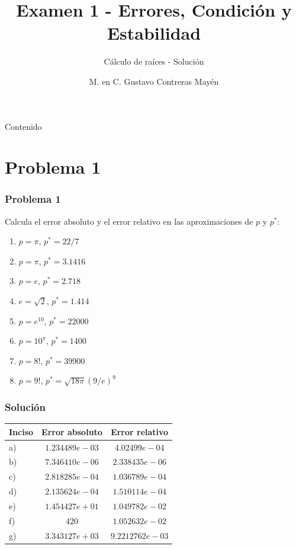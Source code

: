 


\title{Examen 1 - Errores, Condición y Estabilidad}
\subtitle{C\'alculo de ra\'{i}ces - Soluci\'{o}n}
\author{M. en C. Gustavo Contreras Mayén}
\maketitle
\fontsize{14}{14}\selectfont
{}
\begin{frame}{Contenido}
\tableofcontents[pausesections]
\end{frame}
\section{Problema 1}
\begin{frame}
\frametitle{Problema 1}
Calcula el error absoluto y el error relativo en las aproximaciones de $p$ y $p^{*}$:
\begin{multicols}{2}
\begin{enumerate}
\item $p = \pi$, $p^{*} = 22/7$
\item $p = \pi$, $p^{*} = 3.1416$
\item $p = e$, $p^{*} = 2.718$
\item $e = \sqrt{2}$, $p^{*} = 1.414$
\item $p= e^{10}$, $p^{*} = 22000$
\item $p= 10^{\pi}$, $p^{*} = 1400$
\item $p = 8!$, $p^{*}=39900$
\item $p = 9!$, $p^{*}= \sqrt{18 \pi} (9/e)^{9}$
\end{enumerate}
\end{multicols}
\end{frame}
\begin{frame}
\frametitle{Solución}
\begin{tabular}{l | c | c}
\hline
Inciso & Error absoluto & Error relativo \\ \hline
a) & $1.234489e-03$ & $4.02499e-04$ \\ \hline
b) & $7.346410e-06$ & $2.338435e-06$ \\ \hline
c) & $2.818285e-04$ & $1.036789e-04$ \\ \hline
d) & $2.135624e-04$ & $1.510114e-04$ \\ \hline
e) & $1.454427e+01$ & $1.049782e-02$ \\ \hline
f) & $420$ & $1.052632e-02$ \\ \hline
g) & $3.343127e+03$ & $9.2212762e-03$ \\ \hline
\end{tabular}
\end{frame}
